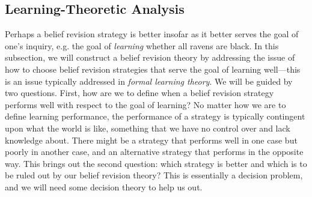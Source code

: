 
\subsection{Learning-Theoretic Analysis}\label{sec-Ockham}


Perhaps a belief revision strategy is better insofar as it better serves the goal of one's inquiry, e.g. the goal of {\em learning} whether all ravens are black. In this subsection, we will construct a belief revision theory by addressing the issue of how to choose belief revision strategies that serve the goal of learning well---this is an issue typically addressed in {\em formal learning theory}. We will be guided by two questions. First, how are we to define when a belief revision strategy performs well with respect to the goal of learning? No matter how we are to define learning performance, the performance of a strategy is typically contingent upon what the world is like, something that we have no control over and lack knowledge about. There might be a strategy that performs well in one case but poorly in another case, and an alternative strategy that performs in the opposite way. This brings out the second question: which strategy is better and which is to be ruled out by our belief revision theory? This is essentially a decision problem, and we will need some decision theory to help us out. 

